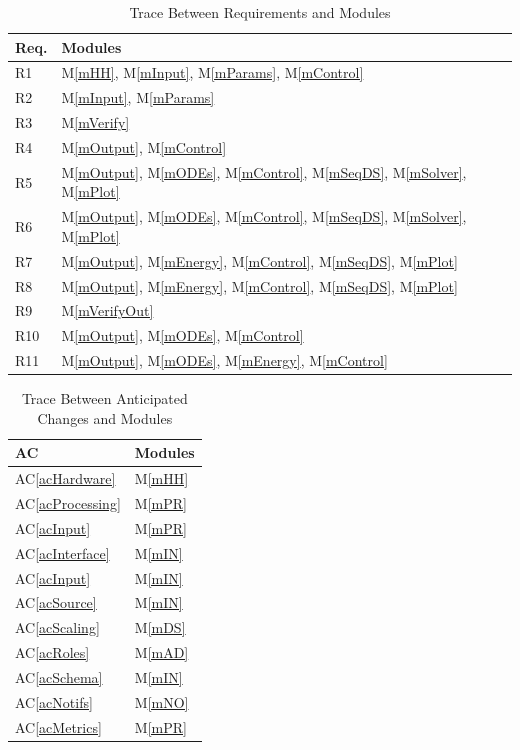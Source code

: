 \documentclass[12pt, titlepage]{article}
\newcommand{\acref}[1]{AC\ref{#1}}
\newcommand{\mref}[1]{M\ref{#1}}
\begin{document}
\begin{table}[H]
\centering
\begin{tabular}{p{} p{}}
\toprule
\textbf{Req.} & \textbf{Modules}\\
\midrule
R1 & \mref{mHH}, \mref{mInput}, \mref{mParams}, \mref{mControl}\\
R2 & \mref{mInput}, \mref{mParams}\\
R3 & \mref{mVerify}\\
R4 & \mref{mOutput}, \mref{mControl}\\
R5 & \mref{mOutput}, \mref{mODEs}, \mref{mControl}, \mref{mSeqDS}, \mref{mSolver}, \mref{mPlot}\\
R6 & \mref{mOutput}, \mref{mODEs}, \mref{mControl}, \mref{mSeqDS}, \mref{mSolver}, \mref{mPlot}\\
R7 & \mref{mOutput}, \mref{mEnergy}, \mref{mControl}, \mref{mSeqDS}, \mref{mPlot}\\
R8 & \mref{mOutput}, \mref{mEnergy}, \mref{mControl}, \mref{mSeqDS}, \mref{mPlot}\\
R9 & \mref{mVerifyOut}\\
R10 & \mref{mOutput}, \mref{mODEs}, \mref{mControl}\\
R11 & \mref{mOutput}, \mref{mODEs}, \mref{mEnergy}, \mref{mControl}\\
\bottomrule
\end{tabular}
\caption{Trace Between Requirements and Modules}
\label{TblRT}
\end{table}

\begin{table}[H]
\centering
\begin{tabular}{p{} p{}}
\toprule
\textbf{AC} & \textbf{Modules}\\
\midrule
\acref{acHardware} & \mref{mHH}\\
\acref{acProcessing} & \mref{mPR}\\
\acref{acInput} & \mref{mPR}\\
\acref{acInterface} & \mref{mIN}\\
\acref{acInput} & \mref{mIN}\\
\acref{acSource} & \mref{mIN}\\
\acref{acScaling} & \mref{mDS}\\
\acref{acRoles} & \mref{mAD}\\
\acref{acSchema} & \mref{mIN}\\
\acref{acNotifs} & \mref{mNO}\\
\acref{acMetrics} & \mref{mPR}\\
\bottomrule
\end{tabular}
\caption{Trace Between Anticipated Changes and Modules}
\label{TblACT}
\end{table}
\end{document}
